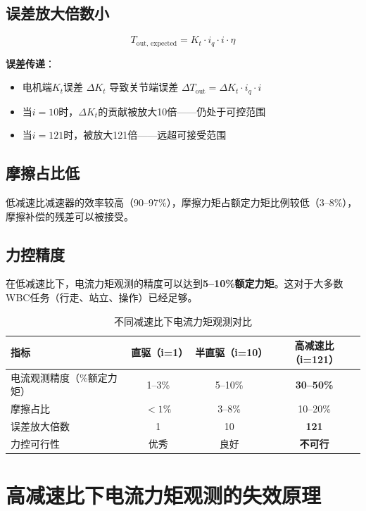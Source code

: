 \subsection{误差放大倍数小}

\begin{equation}
T_{\text{out, expected}} = K_t \cdot i_q \cdot i \cdot \eta
\end{equation}

\textbf{误差传递}：
\begin{itemize}
  \item 电机端$K_t$误差 $\Delta K_t$ 导致关节端误差 $\Delta T_{\text{out}} = \Delta K_t \cdot i_q \cdot i$
  \item 当$i=10$时，$\Delta K_t$的贡献被放大10倍——仍处于可控范围
  \item 当$i=121$时，被放大121倍——远超可接受范围
\end{itemize}

\subsection{摩擦占比低}

低减速比减速器的效率较高（90--97\%），摩擦力矩占额定力矩比例较低（3--8\%），摩擦补偿的残差可以被接受。

\subsection{力控精度}

在低减速比下，电流力矩观测的精度可以达到\textbf{5--10\%额定力矩}。这对于大多数WBC任务（行走、站立、操作）已经足够。

\begin{table}[H]
\centering
\begin{tabular}{lccc}
\toprule
\textbf{指标} & \textbf{直驱（i=1）} & \textbf{半直驱（i=10）} & \textbf{高减速比（i=121）} \\
\midrule
电流观测精度（\%额定力矩） & 1--3\% & 5--10\% & \textbf{30--50\%} \\
摩擦占比 & $<1\%$ & 3--8\% & 10--20\% \\
误差放大倍数 & 1 & 10 & \textbf{121} \\
力控可行性 & 优秀 & 良好 & \textbf{不可行} \\
\bottomrule
\end{tabular}
\caption{不同减速比下电流力矩观测对比}
\label{tab:current_torque_compare}
\end{table}

\section{高减速比下电流力矩观测的失效原理}


